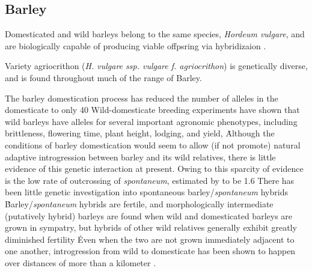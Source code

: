 \documentclass[11pt]{article}
\begin{document}
\subsection*{Barley}

Domesticated and wild barleys belong to the same species, \emph{Hordeum vulgare}, and are biologically capable of producing viable offpsring via hybridizaion \cite{von1995ecographical}.

Variety agriocrithon (\emph{H. vulgare ssp. vulgare f. agriocrithon}) is genetically diverse, and is found throughout much of the range of Barley.

The barley domestication process has reduced the number of alleles in the domesticate to only 40%
Wild-domesticate breeding experiments have shown that wild barleys have alleles for several important agronomic phenotypes, including brittleness, flowering time, plant height, lodging, and yield,  \cite{von2006ab, handley1994chromosome}\.
Although the conditions of barley domestication would seem to allow (if not promote) natural adaptive introgression between barley and its wild relatives, there is little evidence of this genetic interaction at present.
Owing to this sparcity of evidence is the low rate of outcrossing of \emph{spontaneum}, estimated by \cite{brown1978outcrossing} to be 1.6%
There has been little genetic investigation into spontaneous barley/\emph{spontaneum} hybrids \cite{ellstrand2003dangerous}\.
Barley/\emph{spontaneum} hybrids are fertile, and morphologically intermediate (putatively hybrid) barleys are found when wild and domesticated barleys are grown in sympatry, but hybrids of other wild relatives generally exhibit greatly diminished fertility \cite{ellstrand2003dangerous, harlan1995living}\.
Even when the two are not grown immediately adjacent to one another, introgression from wild to domesticate has been shown to happen over distances of more than a kilometer \cite{hillman2001new}.




\end{document}

